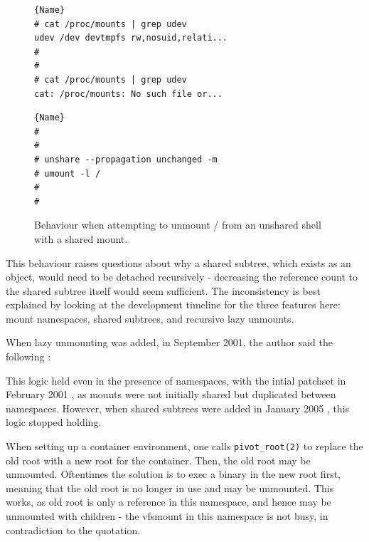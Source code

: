 \documentclass[sigplan]{acmart}
\begin{document}
\begin{figure}
\begin{minipage}{.45\textwidth}

\begin{lstlisting}[frame=tlrb,showlines=true]{Name}
# cat /proc/mounts | grep udev
udev /dev devtmpfs rw,nosuid,relati...
#
#
# cat /proc/mounts | grep udev
cat: /proc/mounts: No such file or...
\end{lstlisting}
\end{minipage}\hfill
\begin{minipage}{.45\textwidth}

\begin{lstlisting}[frame=tlrb]{Name}
#
#
# unshare --propagation unchanged -m
# umount -l /
#
#
\end{lstlisting}

\end{minipage}

\caption{Behaviour when attempting to unmount / from an unshared shell with a shared mount.}
\label{fig:unshare-umount-lazy}
\end{figure}

This behaviour raises questions about why a shared subtree, which exists as an object, would need to be detached recursively - decreasing the reference count to the shared subtree itself would seem sufficient. The inconsistency is best explained by looking at the development timeline for the three features here: mount namespaces, shared subtrees, and recursive lazy unmounts.

When lazy unmounting was added, in September 2001, the author said the following \citep{viro_patch_2001}:


This logic held even in the presence of namespaces, with the intial patchset in February 2001 \citep{viro_patch_2001}, as mounts were not initially shared but duplicated between namespaces. However, when shared subtrees were added in January 2005 \citep{viro_rfc_2005}, this logic stopped holding.

When setting up a container environment, one calls \texttt{pivot\_root(2)} to replace the old root with a new root for the container. Then, the old root may be unmounted. Oftentimes the solution is to exec a binary in the new root first, meaning that the old root is no longer in use and may be unmounted. This works, as old root is only a reference in this namespace, and hence may be unmounted with children - the vfsmount in this namespace is not busy, in contradiction to the quotation.
\end{document}
